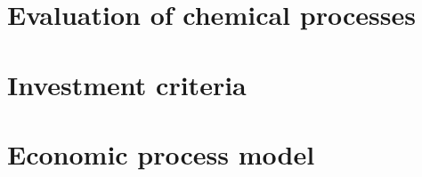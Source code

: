     \section{Evaluation of chemical processes}
    \label{sec:ProjectCost}
    
    
    \section{Investment criteria}
    \label{sec:InvestmentCriteria}
    
    
    \section{Economic process model}
    

